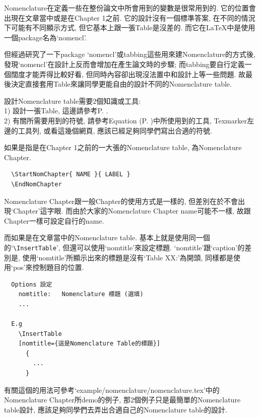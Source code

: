 
Nomenclature在定義一些在整份論文中所會用到的變數是很常用到的. 它的位置會出現在文章當中或是在Chapter 1之前. 它的設計沒有一個標準答案, 在不同的情況下可能有不同顯示方式, 但它基本上跟一張Table是沒差的. 而它在LaTeX中是使用一個package名為`nomencl'.

但經過研究了一下package `nomencl'或tabbing這些用來建Nomenclature的方式後, 發現`nomencl'在設計上反而會增加在產生論文時的步驟; 而tabbing要自行定義一個闊度才能弄得比較好看, 但同時內容卻出現沒法置中和設計上等一些問題. 故最後決定直接套用Table來讓同學更能自由的設計不同的Nomenclature table.

設計Nomenclature table需要2個知識或工具:\\
1) 設計一張Table, 這邊請參考P. .\\
2) 有關所需要用到的符號, 請參考Equation (P. )中所使用到的工具, Texmarker左邊的工具列, 或看這幾個網頁, 應該已經足夠同學們寫出合適的符號.

{}

如果是指是在Chapter 1之前的一大張的Nomenclature table, 為Nomenclature Chapter.
  \begin{verbatim}
  \StartNomChapter{ NAME }{ LABEL }
  \EndNomChapter
  \end{verbatim}
Nomenclature Chapter跟一般Chapter的使用方式是一樣的, 但差別在於不會出現`Chapter'這字眼. 而由於大家的Nomenclature Chapter name可能不一樣, 故跟Chapter一樣可設定自行的name.

而如果是在文章當中的Nomenclature table. 基本上就是使用同一個的`\verb|\InsertTable|', 但還可以使用`nomtitle'來設定標題. `nomtitle'跟`caption'的差別是, 使用`nomtitle'所顯示出來的標題是沒有`Table XX:'為開頭, 同樣都是使用`pos'來控制題目的位置.

  \begin{DescriptionFrame}
  \begin{verbatim}
  Options 設定
    nomtitle:   Nomenclature 標題 (選填)
    ...

  E.g
    \InsertTable
    [nomtitle={這是Nomenclature Table的標題}]
      {
        ...
      }
  \end{verbatim}
  \end{DescriptionFrame}

有關這個的用法可參考`example/nomenclature/nomenclature.tex'中的Nomenclature Chapter所demo的例子, 那2個例子只是最簡單的Nomenclature table設計, 應該足夠同學們去弄出合適自己的Nomenclature table的設計.
